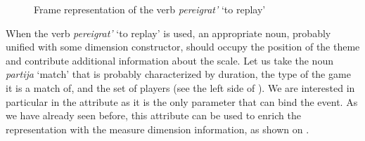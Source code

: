 \begin{figure}
\centering
{}
\caption{Frame representation of the verb \textit{pereigrat'} `to replay' \label{frame:pere:igrat}}
\end{figure}

When the verb \textit{pereigrat'} `to replay' is used, an appropriate noun, probably unified with some dimension constructor, should occupy the position of the theme and contribute additional information about the scale. Let us take the noun \textit{partija} `match' that is probably characterized by duration, the type of the game it is a match of, and the set of players (see the left side of ). We are interested in particular in the \DURATION attribute as it is the only parameter that can bind the event. As we have already seen before, this attribute can be used to enrich the representation with the measure dimension information, as shown on .


